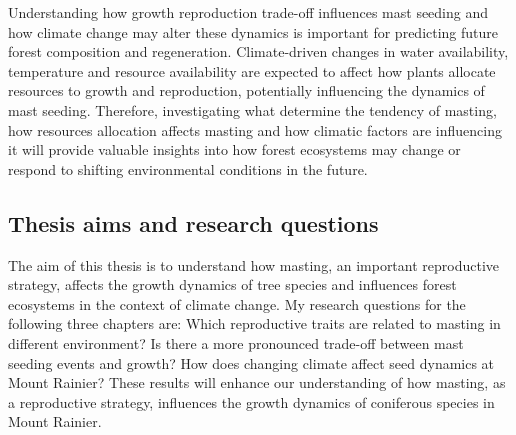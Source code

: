 \documentclass[11pt,letter]{article}
\begin{document}
Understanding how growth reproduction trade-off influences mast seeding and how climate change may alter these dynamics is important for predicting future forest composition and regeneration. Climate-driven changes in water availability, temperature and resource availability are expected to affect how plants allocate resources to growth and reproduction, potentially influencing the dynamics of mast seeding. Therefore, investigating what determine the tendency of masting, how resources allocation affects masting and how climatic factors are influencing it will provide valuable insights into how forest ecosystems may change or respond to shifting environmental conditions in the future.\par

\subsection{Thesis aims and research questions} 
The aim of this thesis is to understand how masting, an important reproductive strategy, affects the growth dynamics of tree species and influences forest ecosystems in the context of climate change. My research questions for the following three chapters are: Which reproductive traits are related to masting in different environment? Is there a more pronounced trade-off between mast seeding events and growth? How does changing climate affect seed dynamics at Mount Rainier? These results will enhance our understanding of how masting, as a reproductive strategy, influences the growth dynamics of coniferous species in Mount Rainier.
\end{document}

